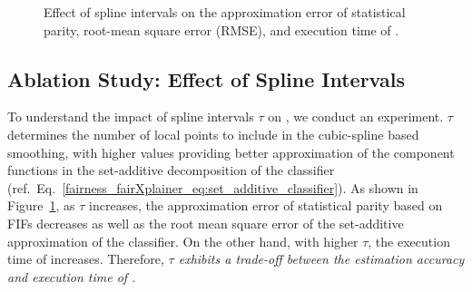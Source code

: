 \begin{figure}
	\caption[Ablation study on FIFs: effect of spline intervals]{Effect of spline intervals on the approximation error of statistical parity, root-mean square error (RMSE), and  execution time of {\fairXplainer}.}
	\label{fairness_fairXplainer_fig:effect_spline_intervals_appendix}
\end{figure}




\subsection{Ablation Study: Effect of Spline Intervals} 
To understand the impact of spline intervals $\tau$ on {\fairXplainer}, we conduct an experiment. $\tau$ determines the number of local points to include in the cubic-spline based smoothing, with higher values providing better approximation of the component functions in the set-additive decomposition of the classifier (ref.\ Eq.~\eqref{fairness_fairXplainer_eq:set_additive_classifier}). As shown in Figure~\ref{fairness_fairXplainer_fig:effect_spline_intervals_appendix}, as $\tau$ increases, the approximation error of statistical parity based on FIFs decreases as well as the root mean square error of the set-additive approximation of the classifier. On the other hand, with higher $ \tau $, the execution time of {\fairXplainer} increases. Therefore, \emph{$ \tau $ exhibits a trade-off between the estimation accuracy and execution time of {\fairXplainer}.}

